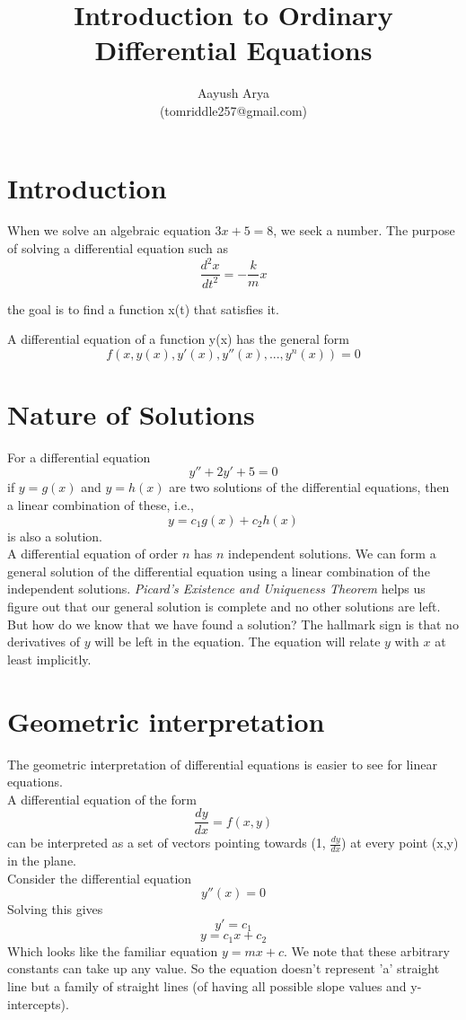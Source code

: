 \documentclass{article}
\author{Aayush Arya \\ (tomriddle257@gmail.com)}
\title{Introduction to Ordinary Differential Equations}
\begin{document}
	\maketitle
	
	\section*{Introduction}
	When we solve an algebraic equation $3x + 5 = 8$, we seek a number. The purpose of solving a differential equation such as
	$$ \frac{d^2x}{dt^2} = -\frac{k}{m}x$$
	
	the goal is to find a function x(t) that satisfies it.
	
	A differential equation of a function y(x) has the general form
	$$ f(x, y(x), y'(x), y''(x), ..., y^n(x)) = 0$$
	
	\section*{Nature of Solutions}
	For a differential equation
		$$ y'' + 2y' + 5 = 0$$
		if $y = g(x)$ and $y = h(x)$ are two solutions of the differential equations, then a linear combination of these, i.e.,
		$$ y = c_1g(x) + c_2h(x) $$
		is also a solution.\\
		
	A differential equation of order $n$ has $n$ independent solutions. We can form a general solution of the differential equation using a linear combination of the independent solutions. \textit{Picard's Existence and Uniqueness Theorem} helps us figure out that our general solution is complete and no other solutions are left.\\ But how do we know that we have found a solution? The hallmark sign is that no derivatives of $y$ will be left in the equation.
	The equation will relate $y$ with $x$ at least implicitly.
	
	\section*{Geometric interpretation}
	The geometric interpretation of differential equations is easier to see for linear equations.\\
	A differential equation of the form
	\begin{equation}
	\frac{dy}{dx} = f(x,y)
	\end{equation}
	can be interpreted as a set of vectors pointing towards (1, $\frac{dy}{dx}$) at every point (x,y) in the plane.%
	\\
	Consider the differential equation
	$$ y''(x) = 0 $$
	Solving this gives
	$$ y' = c_1 $$
	$$ y = c_1x + c_2 $$
	Which looks like the familiar equation $y = mx + c$. We note that these arbitrary constants can take up any value. So the equation doesn't represent 'a' straight line but a family of straight lines (of having all possible slope values and y-intercepts).
	
\end{document}

